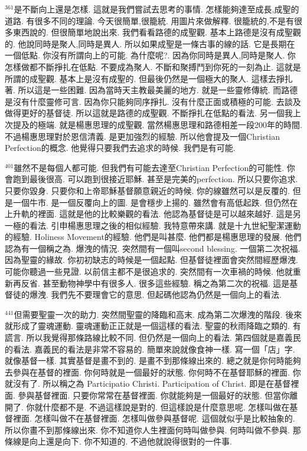 \documentclass{book}
\begin{document}
$^{361}$是不斷向上還是怎樣.
這就是我們嘗試去思考的事情.
怎樣能夠達至成長,成聖的道路.
有很多不同的理論.
今天很簡單,很籠統.
用圖片來做解釋.
很籠統的,不是有很多東西說的.
但很簡單地說出來.
我們看看路德的成聖觀.
基本上路德是沒有成聖觀的.
他說同時是聚人,同時是異人.
所以如果成聖是一條古事的線的話.
它是長期在一個低點.
你沒有所謂向上的可能.
為什麼呢?.
因為你同時是異人,同時是聚人.
你怎樣做都不斷掙扎在低點.
不要成為聚人.
不斷和聚搏鬥到你死的一刻為止.
這就是所謂的成聖觀.
基本上是沒有成聖的.
但最後仍然是一個極大的聚人.
這樣去掙扎著.
所以這是一些困難.
因為當時天主教最美麗的地方.
就是一些靈修傳統.
而路德是沒有什麼靈修可言.
因為你只能夠同序掙扎.
沒有什麼正面或積極的可能.
去談及做得更好的基督徒.
所以這就是路德的成聖觀.
不斷掙扎在低點的看法.
另一個我上次提及的極端.
就是楊惠思理的成聖觀.
當然楊惠思理和路德相差一段200年的時間.
不過楊惠思理對於恩信清義.
是更加強烈的經驗.
所以他會提及一個Christian Perfection的概念.
他覺得只要我們去追求的時候.
我們是有可能.

$^{401}$雖然不是每個人都可能.
但我們有可能去達至Christian Perfection的可能性.
你會跑到最後很高.
可以跑到很接近耶穌.
甚至是完美的perfection.
所以只要你追求.
只要你毀身.
只要你和上帝耶穌基督願意親近的時候.
你的線雖然可以是反覆的.
但是一個牛市.
是一個反覆向上的圖.
是會穩步上揚的.
雖然會有高低起跌.
但仍然在上升軌的裡面.
這就是他的比較樂觀的看法.
他認為基督徒是可以越來越好.
這是另一極的看法.
引申楊惠思理之後的相似經驗.
我特意帶來講.
就是十九世紀聖潔運動的經驗.
Holiness Movement的經驗.
他們是叫甚麼.
他們都是楊惠思理的發展.
他們認為有一個稱之為.
爆洩的情況.
突然間有一個叫second blessing.
一個第二次祝福.
因為聖靈的緣故.
你初初缺志的時候是一個起點.
但基督徒裡面會突然間經歷爆洩.
可能你聽過一些見證.
以前信主都不是很追求的.
突然間有一次車禍的時候.
他就重新再反省.
甚至動物神學中有很多人.
很多這些經驗.
稱之為第二次的祝福.
這是基督徒的爆洩.
我們先不要理會它的意思.
但起碼他認為仍然是一個向上的看法.

$^{441}$但需要聖靈一次的助力.
突然間聖靈的降臨和高末.
成為第二次爆洩的階段.
後來就形成了靈魂運動.
靈魂運動正正就是一個這樣的看法.
聖靈的秋雨降臨之類的.
有謊言.
所以我覺得那條路線比較不同.
但仍然是一個向上的看法.
第四個就是嘉義民的看法.
嘉義民的看法是非常不容易的.
簡單來說就像食神一樣.
寫一個「店」字.
就像基督一樣.
其實基督是畫不到的.
是畫不到那條線出來的.
總之就是你何時能夠去參與在基督的裡面.
你何時就是一個最好的狀態.
你何時不在基督耶穌的裡面.
你就沒有了.
所以稱之為 Participatio Christi.
Participation of Christ.
即是在基督裡面.
參與基督裡面.
只要你常常在基督裡面.
你就能夠是一個最好的狀態.
但當你離開了.
你就什麼都不是.
不過這樣說是對的.
但這樣說是什麼意思呢.
怎樣叫做在基督裡面.
怎樣叫做不在基督裡面.
怎樣叫做參與基督呢.
這個就似乎是比較抽象的.
所以你畫不到那條線出來.
你不知道你人生裡面何時叫做參與.
何時叫做不參與.
那條線是向上還是向下.
你不知道的.
不過他就說得很對的一件事.
\end{document}
